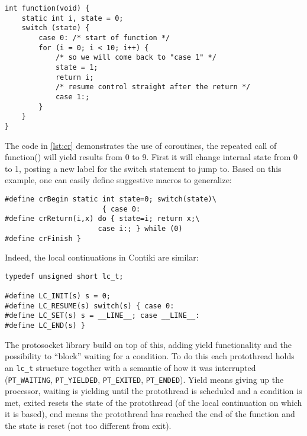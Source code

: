 \lstset{numbers=left, mathescape=true, nolol=false,caption=Coroutines in C (Simon Tatham),label=lst:cr}
\begin{lstlisting}
int function(void) {
    static int i, state = 0;
    switch (state) {
        case 0: /* start of function */
        for (i = 0; i < 10; i++) {
            /* so we will come back to "case 1" */
            state = 1; 
            return i;
            /* resume control straight after the return */
            case 1:; 
        }
    }
}
\end{lstlisting}

The code in \ref{lst:cr} demonstrates the use of coroutines, the repeated call of function() will yield results from 0 to 9. First 
it will change internal state from 0 to 1, posting a new label for the switch statement to jump to. Based on this example, one can 
easily define suggestive macros to generalize:


\lstset{numbers=left, mathescape=true, nolol=false,caption=Coroutine macros in C (Simon Tatham),label=lst:crmacro}
\begin{lstlisting}
#define crBegin static int state=0; switch(state)\
                       { case 0:
#define crReturn(i,x) do { state=i; return x;\ 
                      case i:; } while (0)
#define crFinish }
\end{lstlisting}

Indeed, the local continuations in Contiki are similar:

\lstset{numbers=left, mathescape=true, nolol=false,caption=Local Continuations,label=lst:lc}
\begin{lstlisting}
typedef unsigned short lc_t;

#define LC_INIT(s) s = 0;
#define LC_RESUME(s) switch(s) { case 0:
#define LC_SET(s) s = __LINE__; case __LINE__:
#define LC_END(s) }
\end{lstlisting}

The protosocket library build on top of this, adding yield functionality and the possibility to ``block'' waiting for a condition.
To do this each protothread holds an \texttt{lc\_t} structure together with a semantic of how it was interrupted (\texttt{PT\_WAITING},
\texttt{PT\_YIELDED}, \texttt{PT\_EXITED}, \texttt{PT\_ENDED}). Yield means giving up the processor, waiting is yielding until the 
protothread is scheduled and a condition is met, exited resets the state of the protothread (of the local continuation on which it is
based), end means the protothread has reached the end of the function and the state is reset (not too different from exit).

